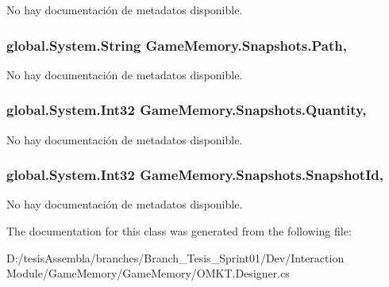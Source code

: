 No hay documentación de metadatos disponible. 

\hypertarget{class_game_memory_1_1_snapshots_abb210bf16aaff23bec1a023f5fcbd2f3}{
\subsubsection[{Path}]{\setlength{\rightskip}{0pt plus 5cm}global.\-System.\-String Game\-Memory.\-Snapshots.\-Path\hspace{0.3cm}{\ttfamily [get]}, {\ttfamily [set]}}}\label{class_game_memory_1_1_snapshots_abb210bf16aaff23bec1a023f5fcbd2f3}


No hay documentación de metadatos disponible. 

\hypertarget{class_game_memory_1_1_snapshots_ac4c2dd5b199a89212283b3ea085db5c9}{
\subsubsection[{Quantity}]{\setlength{\rightskip}{0pt plus 5cm}global.\-System.\-Int32 Game\-Memory.\-Snapshots.\-Quantity\hspace{0.3cm}{\ttfamily [get]}, {\ttfamily [set]}}}\label{class_game_memory_1_1_snapshots_ac4c2dd5b199a89212283b3ea085db5c9}


No hay documentación de metadatos disponible. 

\hypertarget{class_game_memory_1_1_snapshots_ae7206905beee36fb1e969c02a263aa0f}{
\subsubsection[{Snapshot\-Id}]{\setlength{\rightskip}{0pt plus 5cm}global.\-System.\-Int32 Game\-Memory.\-Snapshots.\-Snapshot\-Id\hspace{0.3cm}{\ttfamily [get]}, {\ttfamily [set]}}}\label{class_game_memory_1_1_snapshots_ae7206905beee36fb1e969c02a263aa0f}


No hay documentación de metadatos disponible. 



The documentation for this class was generated from the following file\-:\begin{DoxyCompactItemize}
\item 
D\-:/tesis\-Assembla/branches/\-Branch\-\_\-\-Tesis\-\_\-\-Sprint01/\-Dev/\-Interaction Module/\-Game\-Memory/\-Game\-Memory/O\-M\-K\-T.\-Designer.\-cs\end{DoxyCompactItemize}
